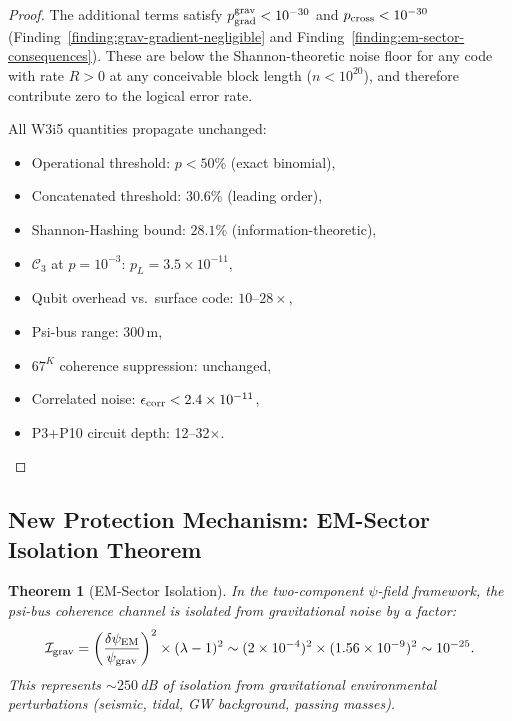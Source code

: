 \documentclass[11pt]{article}
\newtheorem{theorem}{Theorem}[section]
\theoremstyle{definition}
\theoremstyle{remark}
\newcommand{\ee}[1]{\times 10^{#1}}
\newcommand{\psigrav}{\psi_{\rm grav}}
\newcommand{\dpsiEM}{\delta\psi_{\rm EM}}
\begin{document}
\begin{proof}
The additional terms satisfy $p_{\rm grad}^{\rm grav} < 10^{-30}$ and
$p_{\rm cross} < 10^{-30}$ (Finding~\ref{finding:grav-gradient-negligible}
and Finding~\ref{finding:em-sector-consequences}).  These are below
the Shannon-theoretic noise floor for any code with rate $R > 0$ at
any conceivable block length ($n < 10^{20}$), and therefore contribute
zero to the logical error rate.

All W3i5 quantities propagate unchanged:
\begin{itemize}[nosep]
  \item Operational threshold: $p < 50\%$ (exact binomial),
  \item Concatenated threshold: $30.6\%$ (leading order),
  \item Shannon-Hashing bound: $28.1\%$ (information-theoretic),
  \item $\mathcal{C}_3$ at $p = 10^{-3}$: $p_L = 3.5\ee{-11}$,
  \item Qubit overhead vs.\ surface code: $10$--$28\times$,
  \item Psi-bus range: 300\,m,
  \item $67^K$ coherence suppression: unchanged,
  \item Correlated noise: $\epsilon_{\rm corr} < 2.4\ee{-11}$,
  \item P3+P10 circuit depth: 12--32$\times$.
\end{itemize}
\end{proof}

\subsection{New Protection Mechanism: EM-Sector Isolation Theorem}
\label{sec:em-isolation-theorem}

\begin{theorem}[EM-Sector Isolation]
\label{thm:em-isolation}
In the two-component $\psi$-field framework, the psi-bus coherence
channel is isolated from gravitational noise by a factor:
\begin{equation}
  \mathcal{I}_{\rm grav} = \left(\frac{\dpsiEM}{\psigrav}\right)^2
  \times (\lambda-1)^2 \sim (2\ee{-4})^2\times(1.56\ee{-9})^2
  \sim 10^{-25}.
  \label{eq:isolation-factor}
\end{equation}
This represents $\sim 250$\,dB of isolation from gravitational
environmental perturbations (seismic, tidal, GW background, passing
masses).
\end{theorem}
\end{document}
